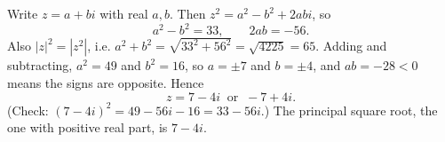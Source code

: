 Write $z=a+bi$ with real $a,b$. Then $z^2=a^2-b^2+2abi$, so
\[a^2-b^2=33,\qquad 2ab=-56.\]
Also $|z|^2=|z^2|$, i.e. $a^2+b^2=\sqrt{33^2+56^2}=\sqrt{4225}=65$. Adding and subtracting, $a^2=49$ and $b^2=16$, so $a=\pm7$ and $b=\pm4$, and $ab=-28<0$ means the signs are opposite. Hence
\[z=\boxed{7-4i\ \text{ or }\ -7+4i}.\]
(Check: $(7-4i)^2=49-56i-16=33-56i$.) The principal square root, the one with positive real part, is $7-4i$.
